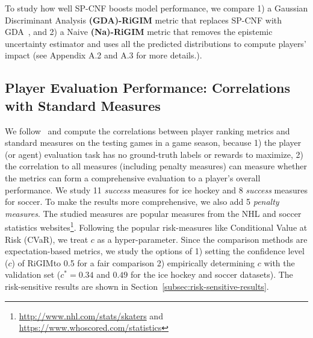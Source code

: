 \documentclass{article}
\newcommand{\confidence}{c}
\newcommand{\sys}{RiGIM}
\newcommand{\system}{\sys\;}
\begin{document}
To study how well SP-CNF boosts model performance, we compare 1) a Gaussian Discriminant Analysis {\bf (GDA)-\system} metric that replaces SP-CNF with GDA~\cite{Mukhoti2021Uncertainty}, and 2) a Naive {\bf (Na)-\system} metric that removes the epistemic uncertainty estimator 
and uses all the predicted distributions to compute players' impact (see Appendix A.2 and A.3 for more details.).


\subsection{Player Evaluation Performance: Correlations with Standard Measures}

We follow~\cite{Liu2018DRL,Luo2020IRL} and compute the correlations between player ranking metrics and standard measures on the testing games in a game season, because 1) the player (or agent) evaluation task has no ground-truth labels or rewards to maximize, 2) the correlation to all measures (including penalty measures) can measure whether the metrics can form a comprehensive evaluation to a player's overall performance. We study 11 {\it success} measures for ice hockey and 8 {\it success} measures for soccer. To make the results more comprehensive, we also add 5 {\it penalty measures}. The studied measures
are popular measures from the NHL and soccer statistics websites\footnote{\url{http://www.nhl.com/stats/skaters} and  \url{https://www.whoscored.com/statistics}}. Following the popular risk-measures like Conditional Value at Risk (CVaR), we treat $\confidence$ as a hyper-parameter.
Since the comparison methods are expectation-based metrics, we study the options of 1) setting the confidence level ($\confidence$) of \system to 0.5 for a fair comparison 2) empirically determining $\confidence$ with the validation set ($\confidence^{*}=0.34$ and $0.49$ for the ice hockey and soccer datasets). The risk-sensitive results are shown in Section~\ref{subsec:risk-sensitive-results}.
\end{document}
